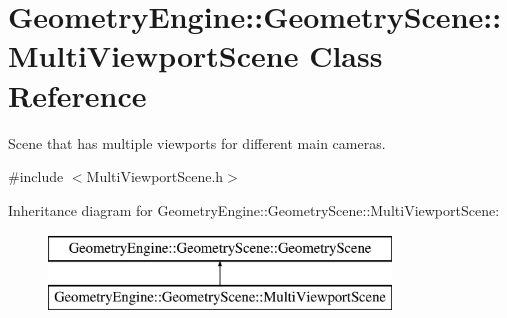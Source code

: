 \hypertarget{class_geometry_engine_1_1_geometry_scene_1_1_multi_viewport_scene}{}\section{Geometry\+Engine\+::Geometry\+Scene\+::Multi\+Viewport\+Scene Class Reference}
\label{class_geometry_engine_1_1_geometry_scene_1_1_multi_viewport_scene}


Scene that has multiple viewports for different main cameras.  




{\ttfamily \#include $<$Multi\+Viewport\+Scene.\+h$>$}

Inheritance diagram for Geometry\+Engine\+::Geometry\+Scene\+::Multi\+Viewport\+Scene\+:\begin{figure}[H]
\begin{center}
\leavevmode
\includegraphics[height=2.000000cm]{class_geometry_engine_1_1_geometry_scene_1_1_multi_viewport_scene}
\end{center}
\end{figure}
